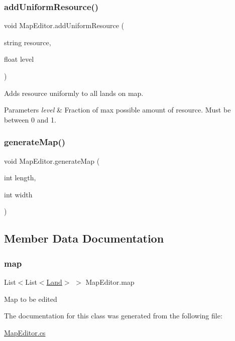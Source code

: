 \mbox{\label{class_map_editor_af0faf8e47a1ed57ada0e1d1f56b64be4}} 
\subsubsection{\texorpdfstring{add\+Uniform\+Resource()}{addUniformResource()}}
{\footnotesize\ttfamily void Map\+Editor.\+add\+Uniform\+Resource (\begin{DoxyParamCaption}\item[{string}]{resource,  }\item[{float}]{level }\end{DoxyParamCaption})}



Adds resource uniformly to all lands on map. 


\begin{DoxyParams}{Parameters}
{\em level} & Fraction of max possible amount of resource. Must be between 0 and 1.\\
\hline
\end{DoxyParams}
\mbox{\label{class_map_editor_a3da89d803fa558eb9cc071a604f4351c}} 
\subsubsection{\texorpdfstring{generate\+Map()}{generateMap()}}
{\footnotesize\ttfamily void Map\+Editor.\+generate\+Map (\begin{DoxyParamCaption}\item[{int}]{length,  }\item[{int}]{width }\end{DoxyParamCaption})}



\subsection{Member Data Documentation}
\mbox{\label{class_map_editor_a3899ec34c7e9acb6cd8b98434504e726}} 
\subsubsection{\texorpdfstring{map}{map}}
{\footnotesize\ttfamily List$<$List$<$\mbox{\hyperlink{class_land}{Land}}$>$ $>$ Map\+Editor.\+map}



Map to be edited 



The documentation for this class was generated from the following file\+:\begin{DoxyCompactItemize}
\item 
\mbox{\hyperlink{_map_editor_8cs}{Map\+Editor.\+cs}}\end{DoxyCompactItemize}
